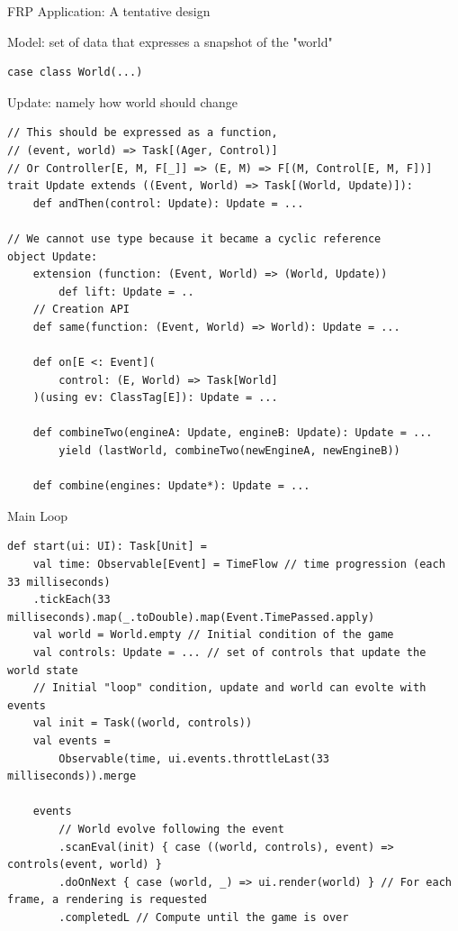 \documentclass[presentation, 9pt]{beamer}\mode<presentation>{\usetheme{AMSBolognaFC}}
\begin{document}
\begin{frame}{FRP Application: A tentative design \href{https://github.com/cric96/scala-frp-gui}{\faLink}}
\begin{alertblock}{Model: set of data that expresses a snapshot of the "world"}
\begin{tcolorbox}[left=0pt, top=0pt, bottom=0pt]
\begin{verbatim}
case class World(...)
			\end{verbatim}
			\end{tcolorbox}
		\end{alertblock}

		\begin{alertblock}{Update: namely how world should change}
			\begin{tcolorbox}[left=0pt, top=0pt, bottom=0pt]
				\begin{verbatim}
// This should be expressed as a function, 
// (event, world) => Task[(Ager, Control)]
// Or Controller[E, M, F[_]] => (E, M) => F[(M, Control[E, M, F])]
trait Update extends ((Event, World) => Task[(World, Update)]):
	def andThen(control: Update): Update = ...

// We cannot use type because it became a cyclic reference
object Update:
	extension (function: (Event, World) => (World, Update))
		def lift: Update = ..
	// Creation API
	def same(function: (Event, World) => World): Update = ...

	def on[E <: Event](
		control: (E, World) => Task[World]
	)(using ev: ClassTag[E]): Update = ...

	def combineTwo(engineA: Update, engineB: Update): Update = ...
		yield (lastWorld, combineTwo(newEngineA, newEngineB))

	def combine(engines: Update*): Update = ...
				\end{verbatim}
				\end{tcolorbox}
			\end{alertblock}

			\begin{alertblock}{Main Loop}
				\begin{tcolorbox}[left=0pt, top=0pt, bottom=0pt]
					\begin{verbatim}
def start(ui: UI): Task[Unit] =
	val time: Observable[Event] = TimeFlow // time progression (each 33 milliseconds)
    .tickEach(33 milliseconds).map(_.toDouble).map(Event.TimePassed.apply)
	val world = World.empty // Initial condition of the game
	val controls: Update = ... // set of controls that update the world state
	// Initial "loop" condition, update and world can evolte with events
	val init = Task((world, controls))
	val events =
		Observable(time, ui.events.throttleLast(33 milliseconds)).merge
	
	events
		// World evolve following the event 
		.scanEval(init) { case ((world, controls), event) => controls(event, world) }
		.doOnNext { case (world, _) => ui.render(world) } // For each frame, a rendering is requested
		.completedL // Compute until the game is over


\end{verbatim}
\end{tcolorbox}
\end{alertblock}
\end{frame}
\end{document}
